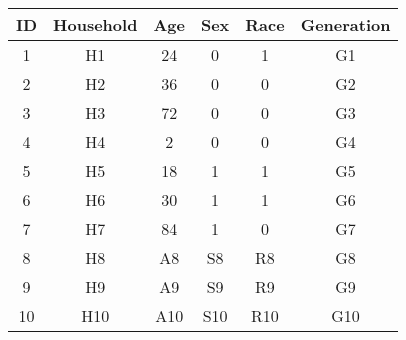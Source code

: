 \begin{tabular}{cccccc}
ID & Household & Age & Sex & Race & Generation \\
\hline
\hline
1 & H1 & 24 & 0 & 1 & G1  \\
\hline
2 & H2 & 36 & 0 & 0 & G2  \\
\hline
3 & H3 & 72 & 0 & 0 & G3  \\
\hline
4 & H4 & 2 & 0 & 0 & G4  \\
\hline
5 & H5 & 18 & 1 & 1 & G5  \\
\hline
6 & H6 & 30 & 1 & 1 & G6  \\
\hline
7 & H7 & 84 & 1 & 0 & G7  \\
\hline
8 & H8 & A8 & S8 & R8 & G8  \\
\hline
9 & H9 & A9 & S9 & R9 & G9  \\
\hline
10 & H10 & A10 & S10 & R10 & G10  \\
\hline
\end{tabular}

